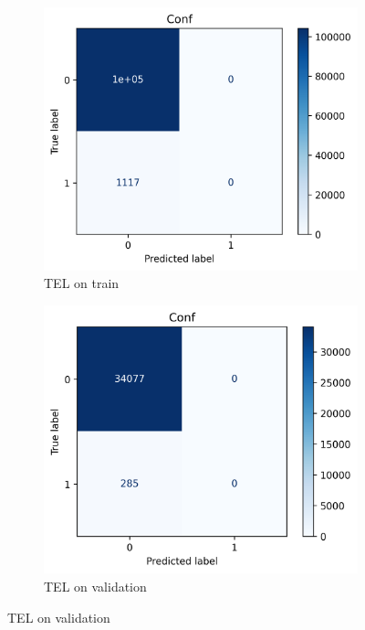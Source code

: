 \documentclass[utf8x]{ctexart}
\begin{document}
\begin{figure}[htb]
  \begin{subfigure}[b]{0.32\textwidth}
    \centering
    \includegraphics[width=\textwidth]{../images/Transformer_train_conf.png}
    \caption{TEL on train}
    \label{fig:Transformer_confusion_train}
  \end{subfigure}
  \begin{subfigure}[b]{0.32\textwidth}
    \centering
    \includegraphics[width=\textwidth]{../images/Transformer_val_conf.png}
    \caption{TEL on validation}
    \label{fig:Transformer_confusion_val}

\end{subfigure}
\end{figure}
\end{document}
